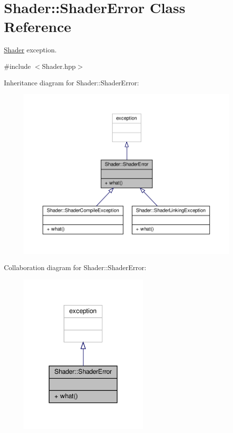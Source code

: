 \hypertarget{class_shader_1_1_shader_error}{}\section{Shader\+:\+:Shader\+Error Class Reference}
\label{class_shader_1_1_shader_error}


\hyperlink{class_shader}{Shader} exception.  




{\ttfamily \#include $<$Shader.\+hpp$>$}



Inheritance diagram for Shader\+:\+:Shader\+Error\+:
\nopagebreak
\begin{figure}[H]
\begin{center}
\leavevmode
\includegraphics[width=350pt]{class_shader_1_1_shader_error__inherit__graph}
\end{center}
\end{figure}


Collaboration diagram for Shader\+:\+:Shader\+Error\+:
\nopagebreak
\begin{figure}[H]
\begin{center}
\leavevmode
\includegraphics[width=185pt]{class_shader_1_1_shader_error__coll__graph}
\end{center}
\end{figure}
